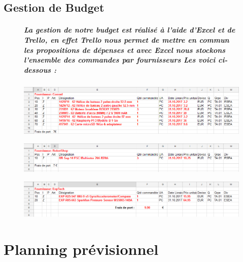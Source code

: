 \documentclass[a4paper,11pt]{report}
\begin{document}
				\section{Gestion de Budget}
					\begin{figure}[!h]
							\paragraph{\newline La gestion de notre budget est réalisé à l'aide d'Excel et de Trello, en effet Trello nous permet de mettre en commun les propositions de dépenses et avec Excel nous stockons l'ensemble des commandes par fournisseurs \newline \newline Les voici ci-dessous : \newline}
							\begin{center}
								\includegraphics[scale=0.5]{Illustrations/Conrad.png}
							\end{center}
					\end{figure}
					\begin{figure}[!h]
							\begin{center}
								\includegraphics[scale=0.5]{Illustrations/Robotshop.png}
							\end{center}
					\end{figure}
					\begin{figure}[!h]
							\begin{center}
								\includegraphics[scale=0.5]{Illustrations/Exptech.png}
							\end{center}
					\end{figure}

\chapter{Planning prévisionnel}
\end{document}
